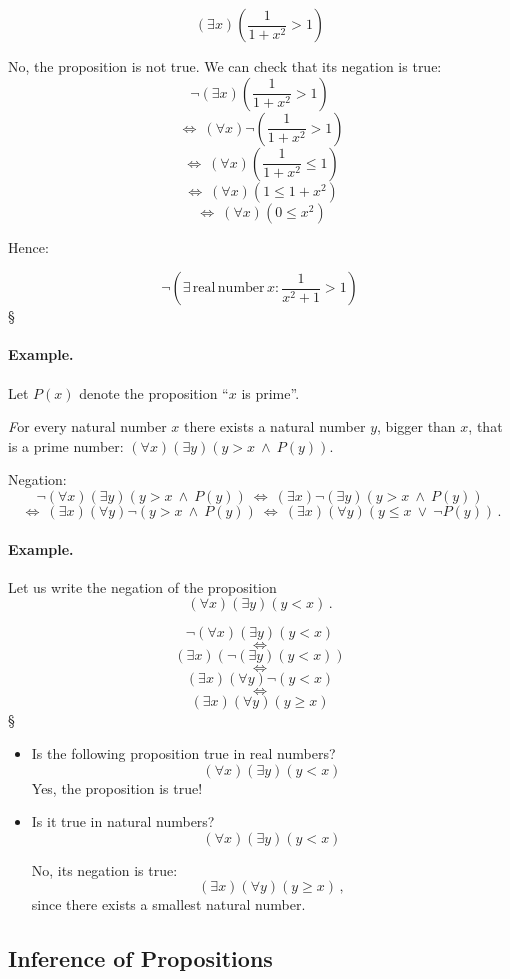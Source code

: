 \documentclass[11pt,paper=b5,footinclude,headinclude]{scrbook} %
\def\ali {{~\vee~}}
\def\inn {{~\wedge~}}
\def\cee {{~\Leftrightarrow~}}
\def\kz{{\hfill{\S}}}%
\theoremstyle{remark}
\theoremstyle{definition} %
\theoremstyle{theorem} %
\begin{document}
$$(\exists x) (\frac{1}{1+x^2} > 1)$$

No, the proposition is not true. We can check that its negation is true:
$$\neg (\exists x) (\frac{1}{1+x^2} > 1)$$
$$\cee (\forall x) \neg (\frac{1}{1+x^2} > 1)$$
$$\cee (\forall x) (\frac{1}{1+x^2} \le  1)$$
$$\cee (\forall x) (1 \le  1+x^2)$$
$$\cee (\forall x) (0 \le  x^2)$$

Hence:

$$
\neg  \left(
\exists \,\mathrm{ real \, number }\,x: \frac{1}{x^2+1}>1
\right)
$$\kz


\medskip
\paragraph{Example.}

Let $P(x)$ denote the proposition ``$x$ is prime''.

{\emph For every natural number $x$ there exists a natural number $y$, bigger than $x$, that is a prime number:
  $(\forall x)(\exists y)(y>x\inn P(y))$.}

  Negation:   $$\neg (\forall x)(\exists y)(y>x\inn P(y)) \cee(\exists  x)\neg (\exists y)(y>x\inn P(y))$$
  $$\cee(\exists  x)(\forall  y)\neg (y>x\inn P(y))\cee(\exists  x)(\forall  y)(y\le x\ali \neg P(y))\,.$$


\bigskip
\bigskip
\paragraph{Example.}
Let us write the negation of the proposition
  $$(\forall x)(\exists y)(y<x)\,.$$

  $$\neg(\forall x)(\exists y)(y<x)$$
  $$\cee$$
  $$(\exists x)(\neg(\exists y)(y<x))$$
  $$\cee$$
  $$(\exists x)(\forall y)\neg(y<x)$$
  $$\cee$$
  $$(\exists x)(\forall y)(y\ge x)$$\kz

\begin{itemize}
  \item Is the following proposition true in real numbers?
  $$(\forall x)(\exists y)(y<x)$$
  Yes, the proposition is true!

  \item Is it true in natural numbers?
  $$(\forall x)(\exists y)(y<x)$$

No, its negation is true:
$$(\exists x)(\forall y)(y\ge x)\,,$$
since there exists a smallest natural number.
\end{itemize}
\subsection*{Inference of Propositions}
\end{document}
